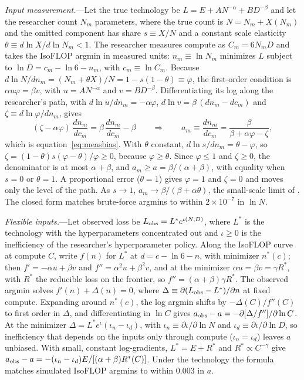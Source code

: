 \emph{Input measurement.}---Let the true technology be $L=E+AN^{-\alpha}+BD^{-\beta}$ and let the researcher count
$N_m$ parameters, where the true count is $N=N_m+X(N_m)$ and the omitted component has share $s\equiv X/N$ and a
constant scale elasticity $\theta\equiv d\ln X/d\ln N_m<1$. The researcher measures compute as $C_m=6N_mD$ and takes
the IsoFLOP argmin in measured units: $n_m\equiv\ln N_m$ minimizes $L$ subject to $\ln D=c_m-\ln6-n_m$, with
$c_m\equiv\ln C_m$. Because $d\ln N/dn_m=(N_m+\theta X)/N=1-s(1-\theta)\equiv\varphi$, the first-order condition is
$\alpha u\varphi=\beta v$, with $u=AN^{-\alpha}$ and $v=BD^{-\beta}$. Differentiating its log along the researcher's
path, with $d\ln u/dn_m=-\alpha\varphi$, $d\ln v=\beta\,(dn_m-dc_m)$ and $\zeta\equiv d\ln\varphi/dn_m$, gives
\[
(\zeta-\alpha\varphi)\,\frac{dn_m}{dc_m}=\beta\,\frac{dn_m}{dc_m}-\beta
\qquad\Longrightarrow\qquad
a_m\equiv\frac{dn_m}{dc_m}=\frac{\beta}{\beta+\alpha\varphi-\zeta},
\]
which is equation~\eqref{eq:measbias}. With $\theta$ constant, $d\ln s/dn_m=\theta-\varphi$, so
$\zeta=(1-\theta)s(\varphi-\theta)/\varphi\ge0$, because $\varphi\ge\theta$. Since $\varphi\le1$ and $\zeta\ge0$, the
denominator is at most $\alpha+\beta$, and $a_m\ge a=\beta/(\alpha+\beta)$, with equality when $s=0$ or $\theta=1$. A
proportional error ($\theta=1$) gives $\varphi=1$ and $\zeta=0$ and moves only the level of the path. As $s\to1$,
$a_m\to\beta/(\beta+\alpha\theta)$, the small-scale limit of \citet{pearce2024reconciling}. The closed form matches
brute-force argmins to within $2\times10^{-7}$ in $\ln N$.

\emph{Flexible inputs.}---Let observed loss be $L_{\rm obs}=L^*e^{\iota(N,D)}$, where $L^*$ is the technology with
the hyperparameters concentrated out and $\iota\ge0$ is the inefficiency of the researcher's hyperparameter policy.
Along the IsoFLOP curve at compute $C$, write $f(n)$ for $L^*$ at $d=c-\ln6-n$, with minimizer $n^*(c)$; then
$f'=-\alpha u+\beta v$ and $f''=\alpha^2u+\beta^2v$, and at the minimizer $\alpha u=\beta v=\gamma R^*$, with $R^*$ the
reducible loss on the frontier, so $f''=(\alpha+\beta)\gamma R^*$. The observed argmin solves $f'(n)+\Delta(n)=0$,
where $\Delta\equiv\partial(L_{\rm obs}-L^*)/\partial n$ at fixed compute. Expanding around $n^*(c)$, the log argmin
shifts by $-\Delta(C)/f''(C)$ to first order in $\Delta$, and differentiating in $\ln C$ gives
$a_{\rm obs}-a=-\partial[\Delta/f'']/\partial\ln C$. At the minimizer $\Delta=L^*e^{\iota}(\iota_n-\iota_d)$, with
$\iota_n\equiv\partial\iota/\partial\ln N$ and $\iota_d\equiv\partial\iota/\partial\ln D$, so inefficiency that depends
on the inputs only through compute ($\iota_n=\iota_d$) leaves $a$ unbiased. With small, constant log-gradients,
$L^*=E+R^*$ and $R^*\propto C^{-\gamma}$ give $a_{\rm obs}-a=-(\iota_n-\iota_d)E/[(\alpha+\beta)R^*(C)]$. Under the
\citet{besiroglu2024chinchilla} technology the formula matches simulated IsoFLOP argmins to within 0.003 in $a$.

